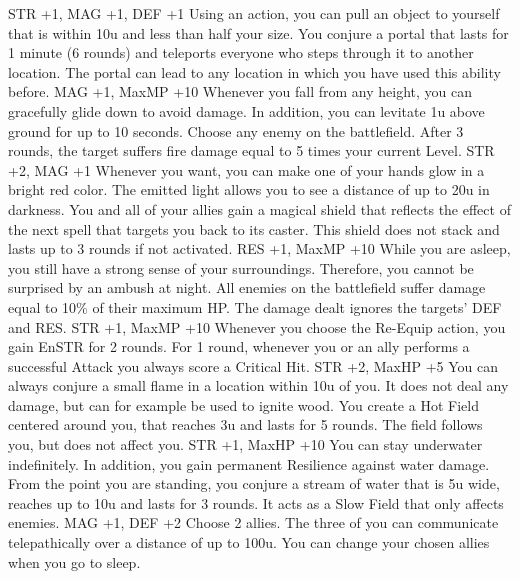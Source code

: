 {STR +1, MAG +1, DEF +1}
%
\vfill
%
{Using an action, you can pull an object to yourself that is within 10u and less than half your size.}
{You conjure a portal that lasts for 1 minute (6 rounds) and teleports everyone who steps through it to another location. The portal can lead to any location in which you have used this ability before.}
{MAG +1, MaxMP +10}
%
\vfill
%
{Whenever you fall from any height, you can gracefully glide down to avoid damage. In addition, you can levitate 1u above ground for up to 10 seconds.}
{Choose any enemy on the battlefield. After 3 rounds, the target suffers fire damage equal to 5 times your current Level.}
{STR +2, MAG +1}
%
\clearpage
%
{Whenever you want, you can make one of your hands glow in a bright red color. The emitted light allows you to see a distance of up to 20u in darkness.}
{You and all of your allies gain a magical shield that reflects the effect of the next spell that targets you back to its caster. This shield does not stack and lasts up to 3 rounds if not activated.}
{RES +1, MaxMP +10}
%
\vfill
%
{While you are asleep, you still have a strong sense of your surroundings. Therefore, you cannot be surprised by an ambush at night.}
{All enemies on the battlefield suffer damage equal to 10\% of their maximum HP. The damage dealt ignores the targets' DEF and RES.}
{STR +1, MaxMP +10}
%
\vfill
%
{Whenever you choose the Re-Equip action, you gain EnSTR for 2 rounds.}
{For 1 round, whenever you or an ally performs a successful Attack you always score a Critical Hit.}
{STR +2, MaxHP +5}
%
\vfill
%
{You can always conjure a small flame in a location within 10u of you. It does not deal any damage, but can for example be used to ignite wood.}
{You create a Hot Field centered around you, that reaches 3u and lasts for 5 rounds. The field follows you, but does not affect you.}
{STR +1, MaxHP +10}
%
\vfill
%
{You can stay underwater indefinitely. In addition, you gain permanent Resilience against water damage.}
{From the point you are standing, you conjure a stream of water that is 5u wide, reaches up to 10u and lasts for 3 rounds. It acts as a Slow Field that only affects enemies.}
{MAG +1, DEF +2}
%
\vfill
%
{Choose 2 allies. The three of you can communicate telepathically over a distance of up to 100u. You can change your chosen allies when you go to sleep.}

